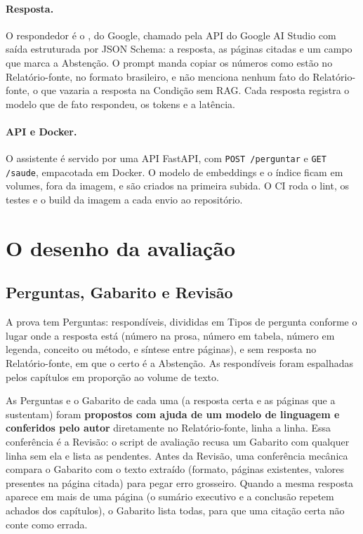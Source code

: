 \documentclass[11pt,a4paper]{article}
\begin{document}
\paragraph{Resposta.} O respondedor é o
\texttt{\NumParametrosModeloRespondedor}, do Google, chamado pela API do
Google AI Studio com saída estruturada por JSON Schema: a resposta, as
páginas citadas e um campo que marca a Abstenção. O prompt manda copiar os
números como estão no Relatório-fonte, no formato brasileiro, e não menciona
nenhum fato do Relatório-fonte, o que vazaria a resposta na Condição sem
RAG. Cada resposta registra o modelo que de fato respondeu, os tokens e a
latência.

\paragraph{API e Docker.} O assistente é servido por uma API FastAPI, com
\texttt{POST /perguntar} e \texttt{GET /saude}, empacotada em Docker. O
modelo de embeddings e o índice ficam em volumes, fora da imagem, e são
criados na primeira subida. O CI roda o lint, os testes e o build da imagem a
cada envio ao repositório.

\section{O desenho da avaliação}

\subsection{Perguntas, Gabarito e Revisão}

A prova tem \NumGabaritoNPerguntas{} Perguntas:
\NumGabaritoNRespondiveis{} respondíveis, divididas em
\NumGabaritoNTipos{} Tipos de pergunta conforme o lugar onde a resposta
está (número na prosa, número em tabela, número em legenda, conceito ou
método, e síntese entre páginas), e \NumGabaritoNSemResposta{} sem resposta
no Relatório-fonte, em que o certo é a Abstenção. As respondíveis foram
espalhadas pelos capítulos em proporção ao volume de texto.

As Perguntas e o Gabarito de cada uma (a resposta certa e as páginas que a
sustentam) foram \textbf{propostos com ajuda de um modelo de linguagem e
conferidos pelo autor} diretamente no Relatório-fonte, linha a linha. Essa conferência é
a Revisão: o script de avaliação recusa um Gabarito com qualquer linha sem
ela e lista as pendentes. Antes da Revisão, uma conferência mecânica compara
o Gabarito com o texto extraído (formato, páginas existentes, valores
presentes na página citada) para pegar erro grosseiro. Quando a mesma
resposta aparece em mais de uma página (o sumário executivo e a conclusão
repetem achados dos capítulos), o Gabarito lista todas, para que uma
citação certa não conte como errada.
\end{document}
